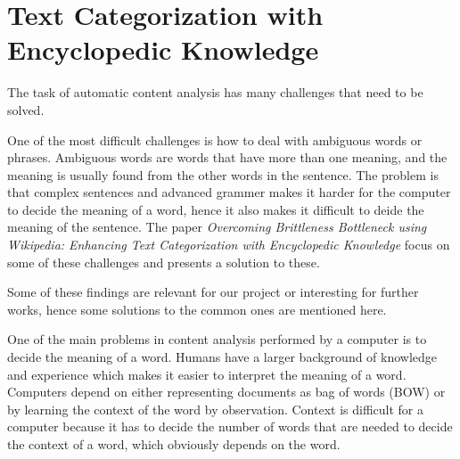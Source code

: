 \section{Text Categorization with Encyclopedic Knowledge}
The task of automatic content analysis has many challenges that need to be solved. 

One of the most difficult challenges is how to deal with ambiguous words or phrases. Ambiguous words are words that have more than one meaning, and the meaning is usually found from the other words in the sentence. The problem is that complex sentences and advanced grammer makes it harder for the computer to decide the meaning of a word, hence it also makes it difficult to deide the meaning of the sentence. 
The paper \emph{Overcoming Brittleness Bottleneck using Wikipedia: Enhancing Text Categorization with Encyclopedic Knowledge} \cite{brittleness} focus on some of these challenges and presents a solution to these. 

Some of these findings are relevant for our project or interesting for further works, hence some solutions to the common ones are mentioned here. 

One of the main problems in  content analysis performed by a computer is to decide the meaning of a word. Humans have a larger background of knowledge and experience which makes it easier to interpret the meaning of a word. Computers depend on either representing documents as bag of words (BOW) or by learning the context of the word by observation. Context is difficult for a computer because it has to decide the number of words that are needed to decide the context of a word, which obviously depends on the word. 



